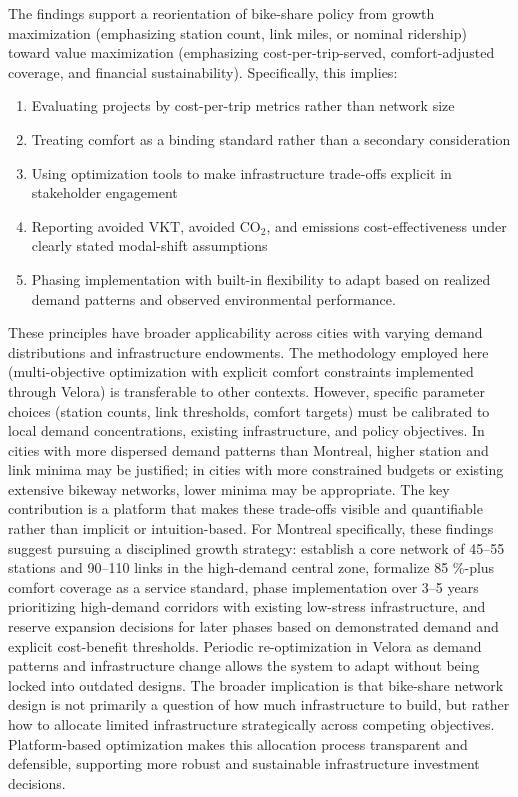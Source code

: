 \documentclass[preprint,authoryear,10pt]{elsarticle}
\begin{document}
The findings support a reorientation of bike-share policy from growth maximization (emphasizing station count, link miles, or nominal ridership) toward value maximization (emphasizing cost-per-trip-served, comfort-adjusted coverage, and financial sustainability). Specifically, this implies:

\begin{enumerate}
    \item Evaluating projects by cost-per-trip metrics rather than network size
    \item Treating comfort as a binding standard rather than a secondary consideration
    \item Using optimization tools to make infrastructure trade-offs explicit in stakeholder engagement
    \item Reporting avoided VKT, avoided CO$_2$, and emissions cost-effectiveness under clearly stated modal-shift assumptions
    \item Phasing implementation with built-in flexibility to adapt based on realized demand patterns and observed environmental performance.
\end{enumerate}

These principles have broader applicability across cities with varying demand distributions and infrastructure endowments. The methodology employed here (multi-objective optimization with explicit comfort constraints implemented through Velora) is transferable to other contexts. However, specific parameter choices (station counts, link thresholds, comfort targets) must be calibrated to local demand concentrations, existing infrastructure, and policy objectives. In cities with more dispersed demand patterns than Montreal, higher station and link minima may be justified; in cities with more constrained budgets or existing extensive bikeway networks, lower minima may be appropriate. The key contribution is a platform that makes these trade-offs visible and quantifiable rather than implicit or intuition-based. For Montreal specifically, these findings suggest pursuing a disciplined growth strategy: establish a core network of 45--55 stations and 90--110 links in the high-demand central zone, formalize 85 \%-plus comfort coverage as a service standard, phase implementation over 3--5 years prioritizing high-demand corridors with existing low-stress infrastructure, and reserve expansion decisions for later phases based on demonstrated demand and explicit cost-benefit thresholds. Periodic re-optimization in Velora as demand patterns and infrastructure change allows the system to adapt without being locked into outdated designs. The broader implication is that bike-share network design is not primarily a question of how much infrastructure to build, but rather how to allocate limited infrastructure strategically across competing objectives. Platform-based optimization makes this allocation process transparent and defensible, supporting more robust and sustainable infrastructure investment decisions.
\end{document}
